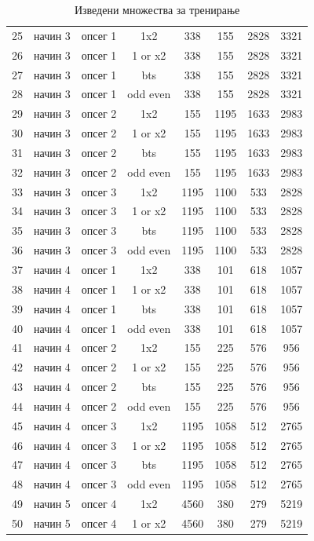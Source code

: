 \begin{table}[hbtp]
{\begin{tabular}{| c | c | c | c | c | c | c | c | }
 25 & начин 3 & опсег 1 & 1x2 & 338 & 155 & 2828 & 3321\\
 26 & начин 3 & опсег 1 & 1 or x2 & 338 & 155 & 2828 & 3321\\
 27 & начин 3 & опсег 1 & bts & 338 & 155 & 2828 & 3321\\
 28 & начин 3 & опсег 1 & odd even & 338 & 155 & 2828 & 3321\\
 29 & начин 3 & опсег 2 & 1x2 & 155 & 1195 & 1633 & 2983\\
 30 & начин 3 & опсег 2 & 1 or x2 & 155 & 1195 & 1633 & 2983\\
 31 & начин 3 & опсег 2 & bts & 155 & 1195 & 1633 & 2983\\
 32 & начин 3 & опсег 2 & odd even & 155 & 1195 & 1633 & 2983\\
 33 & начин 3 & опсег 3 & 1x2 & 1195 & 1100 & 533 & 2828\\
 34 & начин 3 & опсег 3 & 1 or x2 & 1195 & 1100 & 533 & 2828\\
 35 & начин 3 & опсег 3 & bts & 1195 & 1100 & 533 & 2828\\
 36 & начин 3 & опсег 3 & odd even & 1195 & 1100 & 533 & 2828\\
 37 & начин 4 & опсег 1 & 1x2 & 338 & 101 & 618 & 1057\\
 38 & начин 4 & опсег 1 & 1 or x2  & 338 & 101 & 618 & 1057\\
 39 & начин 4 & опсег 1 & bts  & 338 & 101 & 618 & 1057\\
 40 & начин 4 & опсег 1 & odd even  & 338 & 101 & 618 & 1057\\
 41 & начин 4 & опсег 2 & 1x2 & 155 & 225 & 576 & 956\\
 42 & начин 4 & опсег 2 & 1 or x2 & 155 & 225 & 576 & 956\\
 43 & начин 4 & опсег 2 & bts & 155 & 225 & 576 & 956\\
 44 & начин 4 & опсег 2 & odd even & 155 & 225 & 576 & 956\\
 45 & начин 4 & опсег 3 & 1x2 & 1195 & 1058 & 512 & 2765\\
 46 & начин 4 & опсег 3 & 1 or x2 & 1195 & 1058 & 512 & 2765\\
 47 & начин 4 & опсег 3 & bts & 1195 & 1058 & 512 & 2765\\
 48 & начин 4 & опсег 3 & odd even & 1195 & 1058 & 512 & 2765\\
 49 & начин 5 & опсег 4 & 1x2 & 4560 & 380 & 279 & 5219 \\
 50 & начин 5 & опсег 4 & 1 or x2 & 4560 & 380 & 279 & 5219 \\
\hline
\end{tabular}}
\caption{Изведени множества за тренирање}
\label{table:datasets}
\end{table}


